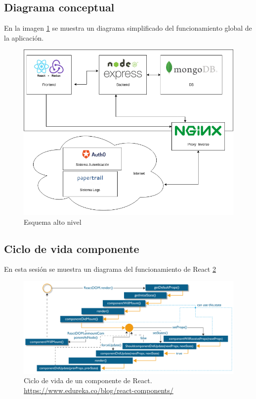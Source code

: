 \subsection {Diagrama conceptual}
En la imagen \ref{fig:esquema_alto_nivel} se muestra un diagrama simplificado del funcionamiento global de la aplicación.
\begin{figure}
  \begin{center}
    \includegraphics[width=\textwidth]{imagenes/diagrama_conceptual.png}
    \caption{Esquema alto nivel}
    \label{fig:esquema_alto_nivel}
  \end{center}
\end{figure}


\subsection {Ciclo de vida componente}
En esta sesión se muestra un diagrama del funcionamiento de React \ref{fig:react}
\begin{figure}
  \begin{center}
    \includegraphics[width=\textwidth]{imagenes/ReactDOM_edureka.png}
    \caption{Ciclo de vida de un componente de React. \url{https://www.edureka.co/blog/react-components/}}
    \label{fig:react}
  \end{center}
\end{figure}

